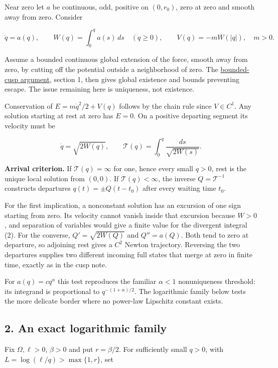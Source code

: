 \documentclass[11pt,a4paper]{article}
\begin{document}
Near zero let \(a\) be continuous, odd, positive on \((0,r_0)\), zero at
zero and smooth away from zero. Consider

\[
 \ddot q=a(q),\qquad W(q)=\int_0^q a(s)\,ds\quad(q\ge0),
 \qquad V(q)=-mW(|q|),\quad m>0.
 \tag{1}
\]

Assume a bounded continuous global extension of the force, smooth away
from zero, by cutting off the potential outside a neighborhood of zero.
The \href{newton-cusp-preparation-floor.md}{bounded-cusp argument},
section 1, then gives global existence and bounds preventing escape. The
issue remaining here is uniqueness, not existence.

Conservation of \(E=m\dot q^2/2+V(q)\) follows by the chain rule since
\(V\in C^1\). Any solution starting at rest at zero has \(E=0\). On a
positive departing segment its velocity must be

\[
 \dot q=\sqrt{2W(q)},\qquad
 \mathcal T(q)=\int_0^q\frac{ds}{\sqrt{2W(s)}}.
 \tag{2}
\]

\textbf{Arrival criterion.} If \(\mathcal T(q)=\infty\) for one, hence
every small \(q>0\), rest is the unique local solution from \((0,0)\).
If \(\mathcal T(q)<\infty\), the inverse \(Q=\mathcal T^{-1}\)
constructs departures \(q(t)=\pm Q(t-t_0)\) after every waiting time
\(t_0\).

For the first implication, a nonconstant solution has an excursion of
one sign starting from zero. Its velocity cannot vanish inside that
excursion because \(W>0\), and separation of variables would give a
finite value for the divergent integral (2). For the converse,
\(Q'=\sqrt{2W(Q)}\) and \(Q''=a(Q)\). Both tend to zero at departure, so
adjoining rest gives a \(C^2\) Newton trajectory. Reversing the two
departures supplies two different incoming full states that merge at
zero in finite time, exactly as in the cusp note.

For \(a(q)=c q^\alpha\) this test reproduces the familiar \(\alpha<1\)
nonuniqueness threshold: its integrand is proportional to
\(q^{-(1+\alpha)/2}\). The logarithmic family below tests the more
delicate border where no power-law Lipschitz constant exists.

\subsection{2. An exact logarithmic
family}\label{an-exact-logarithmic-family}

Fix \(\Omega,\ell>0\), \(\beta>0\) and put \(r=\beta/2\). For
sufficiently small \(q>0\), with \(L=\log(\ell/q)>\max\{1,r\}\), set
\end{document}
